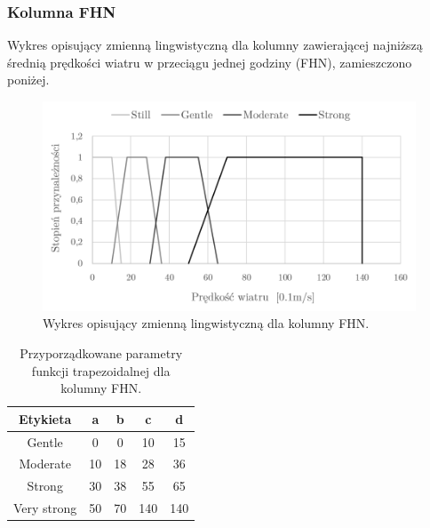 \documentclass{classrep}
\begin{document}
\clearpage

\subsubsection{Kolumna FHN}
Wykres opisujący zmienną lingwistyczną dla kolumny zawierającej najniższą średnią prędkości wiatru w przeciągu jednej godziny (FHN), zamieszczono poniżej.
\begin{figure}[H]
	\centering
	\includegraphics[width=0.99\textwidth]{Pictures/TermsCharts/FHN.png}
	\caption{Wykres opisujący zmienną lingwistyczną dla kolumny FHN.}
\end{figure}

\begin{table}[H]
	\centering
	\begin{tabular}{c c c c c} 
		\hline
		\textbf{Etykieta} & \textbf{a} & \textbf{b} & \textbf{c} & \textbf{d}\\ [0.5ex] 
		\hline
		\hline 
Gentle	 & 0 & 0 & 10 & 15 \\
Moderate & 10 & 18 & 28 & 36 \\
Strong	 & 30 & 38 & 55 & 65 \\
Very strong & 50 & 70 & 140 & 140 \\
		\hline
	\end{tabular}
	\caption{Przyporządkowane parametry funkcji trapezoidalnej dla kolumny FHN.}
\end{table}

\clearpage
\end{document}
